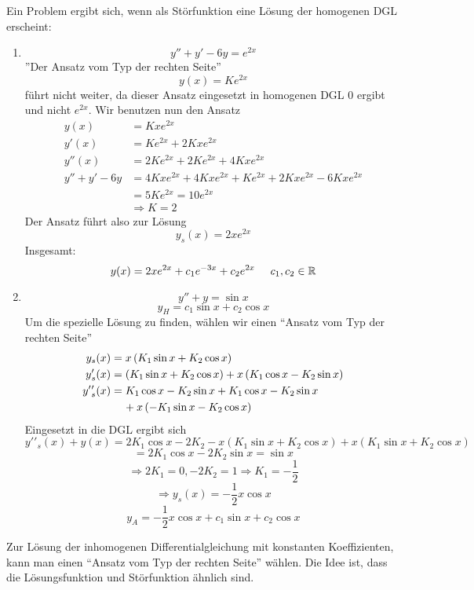 Ein Problem ergibt sich, wenn als Störfunktion eine Lösung der homogenen DGL erscheint:
\begin{enumerate}[\indent 3.]
\item \[y''+y'-6y=e^{2x}\]''Der Ansatz vom Typ der rechten Seite''\[y(x)=Ke^{2x}\] führt nicht weiter, da dieser Ansatz eingesetzt in homogenen DGL 0 ergibt und nicht $e^{2x}$. Wir benutzen nun den Ansatz
\begin{align*}
y(x)&=Kxe^{2x}\\
y'(x) &= K{e^{2x}} + 2Kx{e^{2x}}\\
y''(x) &= 2K{e^{2x}} + 2K{e^{2x}} + 4Kx{e^{2x}}\\
y'' + y' - 6y &= 4Kx{e^{2x}} + 4Kx{e^{2x}} + K{e^{2x}} + 2Kx{e^{2x}} - 6Kx{e^{2x}}\\
 &= 5K{e^{2x}} = 10{e^{2x}}\\
&\Rightarrow K=2
\end{align*}
Der Ansatz führt also zur Lösung \[y_s(x)=2xe^{2x}\]
Insgesamt: \[y(x)=2xe^{2x}+c_1e^{-3x}+c_2e^{2x}\text{\hspace{5mm}}c_1,c_2\in\mathbb{R}\]
\item \[y''+y=\sin x\]
\[y_H=c_1\sin x+c_2\cos x\]
Um die spezielle Lösung zu finden, wählen wir einen ``Ansatz vom Typ der rechten Seite''
\begin{align*}
{y_s}(x) &= x\left( {{K_1}\sin x + {K_2}\cos x} \right)\\
y{'_s}(x) &= \left( {{K_1}\sin x + {K_2}\cos x} \right) + x\left( {{K_1}\cos x - {K_2}\sin x} \right)\\
y'{'_s}(x) &= {K_1}\cos x - {K_2}\sin x + {K_1}\cos x - {K_2}\sin x\\
 &\hspace{4mm}+ x\left( { - {K_1}\sin x - {K_2}\cos x} \right)
\end{align*}
Eingesetzt in die DGL ergibt sich
\[y'{'_s}(x) + y(x) = 2{K_1}\cos x - 2{K_2} - x({K_1}\sin x + {K_2}\cos x) + x({K_1}\sin x + {K_2}\cos x)\]
\[=2K_1\cos x-2K_2 \sin x=\sin x\]
\[\Rightarrow 2K_1=0, -2K_2=1\Rightarrow K_1=-\frac{1}{2}\]
\[\Rightarrow y_s(x)=-\frac{1}{2}x\cos x\]
\[y_A=-\frac{1}{2}x\cos x+c_1 \sin x+c_2\cos x\]
\end{enumerate}
Zur Lösung der inhomogenen Differentialgleichung mit konstanten Koeffizienten, kann man einen ``Ansatz vom Typ der rechten Seite'' wählen. Die Idee ist, dass die Lösungsfunktion und Störfunktion ähnlich sind.

